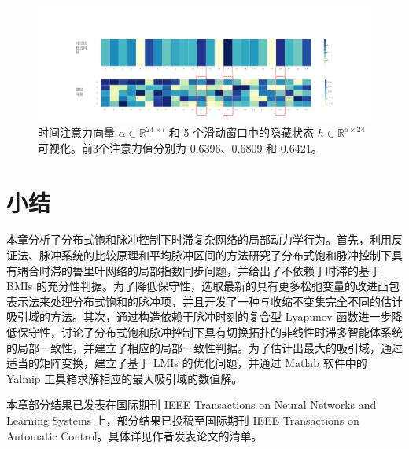 \begin{table}[h]
\centering
\caption{\label{table7}采用不同注意力权重计算方法的自我注意力层的性能}
\end{table}

\begin{figure}[htbp]
\begin{center}
\includegraphics[scale=0.25]{./ch4/fig4_6.pdf}
\caption{时间注意力向量 $\alpha \in \mathbb{R}^{24 \times l}$ 和 5 个滑动窗口中的隐藏状态 $h \in \mathbb{R}^{5 \times 24}$ 可视化。前3个注意力值分别为 0.6396、0.6809 和 0.6421。} \label{fig4_6}
\end{center}
\end{figure}


\section{小结}

本章分析了分布式饱和脉冲控制下时滞复杂网络的局部动力学行为。首先，利用反证法、脉冲系统的比较原理和平均脉冲区间的方法研究了分布式饱和脉冲控制下具有耦合时滞的鲁里叶网络的局部指数同步问题，并给出了不依赖于时滞的基于 BMIs 的充分性判据。为了降低保守性，选取最新的具有更多松弛变量的改进凸包表示法来处理分布式饱和的脉冲项，并且开发了一种与收缩不变集完全不同的估计吸引域的方法。其次，通过构造依赖于脉冲时刻的复合型 Lyapunov 函数进一步降低保守性，讨论了分布式饱和脉冲控制下具有切换拓扑的非线性时滞多智能体系统的局部一致性，并建立了相应的局部一致性判据。为了估计出最大的吸引域，通过适当的矩阵变换，建立了基于 LMIs 的优化问题，并通过 Matlab 软件中的 Yalmip 工具箱求解相应的最大吸引域的数值解。  

本章部分结果已发表在国际期刊  IEEE Transactions on Neural Networks and Learning Systems 上，部分结果已投稿至国际期刊 IEEE
Transactions on Automatic Control。具体详见作者发表论文的清单。
